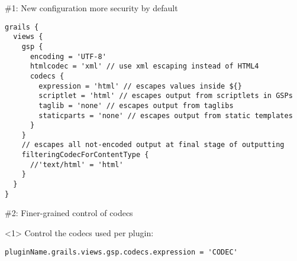 {\begin{frame}

    \begin{center}
      \Huge\color{green} \#1: New configuration more security by default
    \end{center}

    \begin{center}
      \begin{minipage}{1.1\textwidth}
        \begin{verbatim}
grails {
  views {
    gsp {
      encoding = 'UTF-8'
      htmlcodec = 'xml' // use xml escaping instead of HTML4
      codecs {
        expression = 'html' // escapes values inside ${}
        scriptlet = 'html' // escapes output from scriptlets in GSPs
        taglib = 'none' // escapes output from taglibs
        staticparts = 'none' // escapes output from static templates
      }
    }
    // escapes all not-encoded output at final stage of outputting
    filteringCodecForContentType {
      //'text/html' = 'html'
    }
  }
}
        \end{verbatim}
      \end{minipage}
    \end{center}

\end{frame}


\begin{frame}

    \begin{center}
      \Huge\color{green} \#2: Finer-grained control of codecs
    \end{center}

    \vspace{1cm}

    \begin{onlyenv}<1>
      Control the codecs used per plugin:
      \begin{center}
        \begin{minipage}{\textwidth}
          \begin{verbatim}
pluginName.grails.views.gsp.codecs.expression = 'CODEC'
          \end{verbatim}
        \end{minipage}
      \end{center}
    \end{onlyenv}


\end{frame}}
